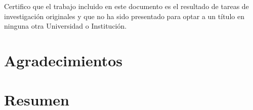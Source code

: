 \documentclass[spanish,a4paper,oneside,12pt,openright]{book}
\begin{document}
\thispagestyle{empty}
\null
\clearpage

 \cleardoublepage


Certifico que el trabajo incluido en este documento es el resultado de tareas de investigación
originales y que no ha sido presentado para optar a un título en ninguna otra
Universidad o Institución.

\vspace{3cm}
\begin{flushright}
\authorname
\end{flushright}
\cleardoublepage




\clearpage
\thispagestyle{empty}
\phantom{p. 2}
\clearpage

\chapter*{Agradecimientos} %



\phantom{p. 1}
\clearpage
\thispagestyle{empty}
\phantom{p. 2}
\clearpage

\chapter*{Resumen} %


\phantom{p. 1}
\clearpage
\thispagestyle{empty}
\end{document}
